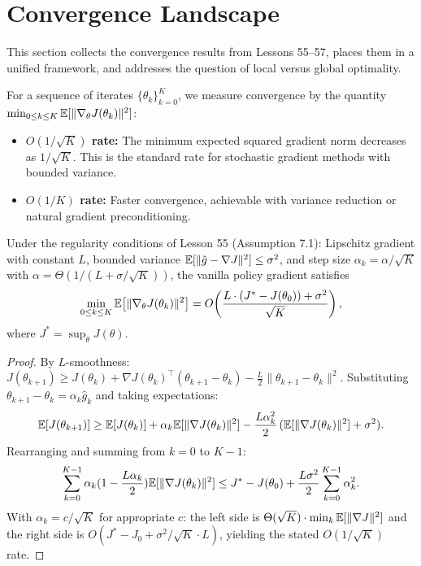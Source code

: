\documentclass[11pt,a4paper]{article}
\begin{document}
\section{Convergence Landscape}

This section collects the convergence results from Lessons 55--57,
places them in a unified framework, and addresses the question of
local versus global optimality.

\begin{definition}
\label{def:convergence-rates}
For a sequence of iterates $\{\theta_k\}_{k=0}^{K}$, we measure
convergence by the quantity $\min_{0 \leq k \leq K}
\mathbb{E}[\|\nabla_\theta J(\theta_k)\|^2]$:
\begin{itemize}
  \item \textbf{$O(1/\sqrt{K})$ rate:} The minimum expected squared
    gradient norm decreases as $1/\sqrt{K}$. This is the standard
    rate for stochastic gradient methods with bounded variance.
  \item \textbf{$O(1/K)$ rate:} Faster convergence, achievable with
    variance reduction or natural gradient preconditioning.
\end{itemize}
\end{definition}

\begin{theorem}
\label{thm:convergence-vanilla}
Under the regularity conditions of Lesson 55 (Assumption 7.1):
Lipschitz gradient with constant $L$, bounded variance
$\mathbb{E}[\|\hat{g} - \nabla J\|^2] \leq \sigma^2$, and step size
$\alpha_k = \alpha / \sqrt{K}$ with $\alpha = \Theta(1/(L +
\sigma/\sqrt{K}))$, the vanilla policy gradient satisfies
\[
  \min_{0 \leq k \leq K} \mathbb{E}\!\left[\|\nabla_\theta J(\theta_k)\|^2\right]
  = O\!\left(\frac{L \cdot (J^* - J(\theta_0)) + \sigma^2}{\sqrt{K}}\right),
\]
where $J^* = \sup_\theta J(\theta)$.
\end{theorem}

\begin{proof}
By $L$-smoothness:
$J(\theta_{k+1}) \geq J(\theta_k) + \nabla J(\theta_k)^\top
(\theta_{k+1} - \theta_k) - \frac{L}{2}\|\theta_{k+1} - \theta_k\|^2$.
Substituting $\theta_{k+1} - \theta_k = \alpha_k \hat{g}_k$ and taking
expectations:
\[
  \mathbb{E}[J(\theta_{k+1})] \geq \mathbb{E}[J(\theta_k)] + \alpha_k \mathbb{E}[\|\nabla J(\theta_k)\|^2]
  - \frac{L \alpha_k^2}{2}\, (\mathbb{E}[\|\nabla J(\theta_k)\|^2] + \sigma^2).
\]
Rearranging and summing from $k = 0$ to $K-1$:
\[
  \sum_{k=0}^{K-1} \alpha_k (1 - \frac{L\alpha_k}{2})
  \mathbb{E}[\|\nabla J(\theta_k)\|^2]
  \leq J^* - J(\theta_0) + \frac{L\sigma^2}{2} \sum_{k=0}^{K-1} \alpha_k^2.
\]
With $\alpha_k = c/\sqrt{K}$ for appropriate $c$: the left side is
$\Theta(\sqrt{K}) \cdot \min_k \mathbb{E}[\|\nabla J\|^2]$ and the right side
is $O(J^* - J_0 + \sigma^2/\sqrt{K} \cdot L)$, yielding the stated
$O(1/\sqrt{K})$ rate.
\end{proof}
\end{document}
